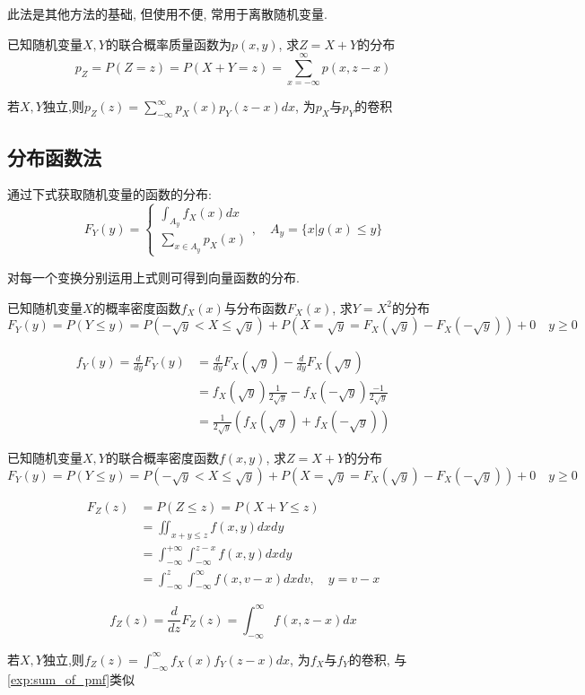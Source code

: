 此法是其他方法的基础, 但使用不便, 常用于离散随机变量.

\begin{example}\label{exp:sum_of_pmf}
    已知随机变量$X,Y$的联合概率质量函数为$p(x,y)$, 求$Z=X+Y$的分布
    \[ p_Z=P(Z=z)=P(X+Y=z)=\sum_{x=-\infty}^{\infty}p(x, z-x) \]

    若$X,Y$独立,则$p_Z(z)=\sum_{-\infty}^{\infty}p_X(x)p_Y(z-x)dx$, 为$p_X$与$p_Y$的卷积
\end{example}

\subsection{分布函数法}

通过下式获取随机变量的函数的分布:
\[ F_Y(y)=\begin{cases}
        \int_{A_y}f_X(x)dx \\
        \sum_{x \in A_y}p_X(x)
    \end{cases} , \quad A_y=\{ x|g(x)\le y \}
\]

对每一个变换分别运用上式则可得到向量函数的分布.

\begin{example}
    已知随机变量$X$的概率密度函数$f_X(x)$与分布函数$F_X(x)$, 求$Y=X^2$的分布
    \[ F_Y(y)=P(Y\le y)=P(-\sqrt{y}<X\le \sqrt{y})+P(X=\sqrt{y}=F_X(\sqrt{y})-F_X(-\sqrt{y}))+0 \quad y\ge 0\]

    \begin{align*}
        f_Y(y) =\frac{d}{dy}F_Y(y) & =\frac{d}{dy}F_X(\sqrt{y}) -\frac{d}{dy}F_X(\sqrt{y})                 \\
                                   & =f_X(\sqrt{y})\frac{1}{2\sqrt{y}} -f_X(-\sqrt{y})\frac{-1}{2\sqrt{y}} \\
                                   & =\frac{1}{2\sqrt{y}}(f_X(\sqrt{y})+f_X(-\sqrt{y}))
    \end{align*}

\end{example}

\begin{example}\label{exp:sum_of_pdf}
    已知随机变量$X,Y$的联合概率密度函数$f(x,y)$, 求$Z=X+Y$的分布
    \[ F_Y(y)=P(Y\le y)=P(-\sqrt{y}<X\le \sqrt{y})+P(X=\sqrt{y}=F_X(\sqrt{y})-F_X(-\sqrt{y}))+0 \quad y\ge 0\]

    \begin{align*}
        F_Z(z) & =P(Z\le z)=P(X+Y\le z)                                               \\
               & =\iint _{x+y\leqslant z}f(x,y)dxdy                                   \\
               & =\int_{-\infty}^{+\infty}\int_{-\infty}^{z-x}f(x,y)dxdy              \\
               & =\int_{-\infty}^{z}\int_{-\infty}^{\infty}f(x,v-x)dxdv, \quad y= v-x
    \end{align*}

    \[ f_Z(z)=\frac{d}{dz}F_Z(z)=\int_{-\infty}^{\infty}f(x,z-x)dx \]

    若$X,Y$独立,则$f_Z(z)=\int_{-\infty}^{\infty}f_X(x)f_Y(z-x)dx$, 为$f_X$与$f_Y$的卷积, 与\ref{exp:sum_of_pmf}类似
\end{example}

